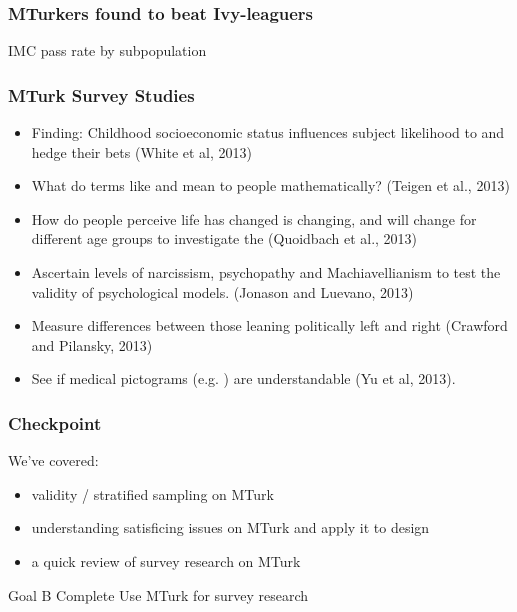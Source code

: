\documentclass[slides]{beamer} %
\begin{document}
\begin{frame}\frametitle{MTurkers found to beat Ivy-leaguers}


\centering
IMC pass rate by subpopulation

\end{frame}

\begin{frame}\frametitle{MTurk Survey Studies}
 \pause

\footnotesize
\vspace{-0.2cm}
\begin{itemize}
\footnotesize

\item Finding: Childhood socioeconomic status influences subject likelihood to  and hedge their bets (White et al, 2013) \pause
\item What do terms like  and  mean to people mathematically? (Teigen et al., 2013) \pause
\item How  do people perceive life has changed is changing, and will change for different age groups to investigate the  (Quoidbach et al., 2013) \pause
\item Ascertain levels of narcissism, psychopathy and Machiavellianism to test the validity of psychological models. (Jonason and Luevano, 2013) \pause
\item Measure  differences between  those leaning politically left and right (Crawford and Pilansky, 2013)  \pause
\item See if medical pictograms (e.g. ) are understandable (Yu et al, 2013).
\end{itemize}

\vspace{-0.5cm}

\end{frame}

\begin{frame}\frametitle{Checkpoint}

We've covered: \pause

\begin{itemize}
\item validity / stratified sampling on MTurk \pause
\item understanding satisficing issues on MTurk and apply it to design \pause
\item a quick review of survey research on MTurk \pause
\end{itemize}

\begin{block}{Goal B Complete}
\small
Use MTurk for survey research
\end{block}

\end{frame}
\end{document}

